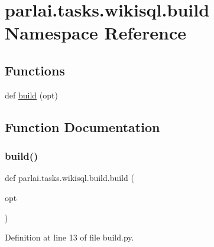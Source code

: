 \hypertarget{namespaceparlai_1_1tasks_1_1wikisql_1_1build}{}\section{parlai.\+tasks.\+wikisql.\+build Namespace Reference}
\label{namespaceparlai_1_1tasks_1_1wikisql_1_1build}
\subsection*{Functions}
\begin{DoxyCompactItemize}
\item 
def \hyperlink{namespaceparlai_1_1tasks_1_1wikisql_1_1build_a8b1665667190720ed464d8a0fcf056ba}{build} (opt)
\end{DoxyCompactItemize}


\subsection{Function Documentation}
\mbox{\label{namespaceparlai_1_1tasks_1_1wikisql_1_1build_a8b1665667190720ed464d8a0fcf056ba}} 
\subsubsection{\texorpdfstring{build()}{build()}}
{\footnotesize\ttfamily def parlai.\+tasks.\+wikisql.\+build.\+build (\begin{DoxyParamCaption}\item[{}]{opt }\end{DoxyParamCaption})}



Definition at line 13 of file build.\+py.


